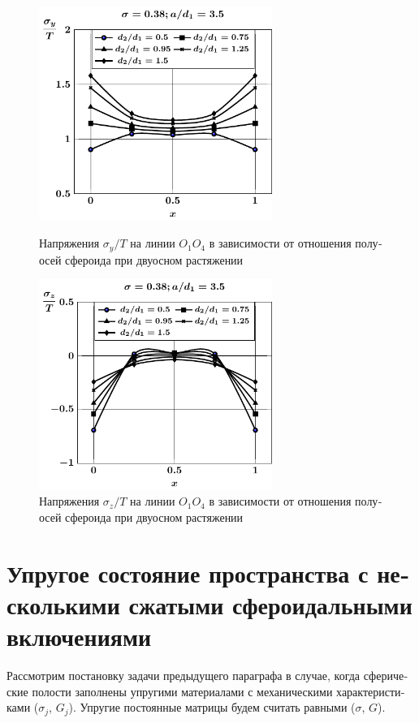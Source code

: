 \begin{russian}
\begin{figure}[h!]
\centering\footnotesize
\parbox[b]{7.5cm}{\centering\includegraphics[width=7.6cm]{cav4-prolate-oblate-a35-t2-sig_y.pdf}
\caption{Напряжения $\sigma_y/T$ на линии $O_1O_4$ в зависимости от отношения полуосей сфероида при двуосном растяжении
\label{f:10:12}}}\hfil\hfil
\parbox[b]{7.5cm}{\centering\includegraphics[width=7.6cm]{cav4-prolate-oblate-a35-t2-sig_z.pdf}
\caption{Напряжения $\sigma_z/T$ на линии $O_1O_4$ в зависимости от отношения полуосей сфероида при двуосном растяжении
\label{f:10:13}}}
\end{figure}

\section[Упругое состояние пространства с несколькими сжатыми сфероидальными включениями]{Упругое состояние пространства с несколькими сжатыми сфероидальными включениями}

Рассмотрим постановку задачи предыдущего параграфа в случае, когда сферические полости заполнены упругими материалами с механическими характеристиками ($\sigma_j$, $G_j$). Упругие постоянные матрицы будем считать равными ($\sigma$, $G$).


\end{russian}
